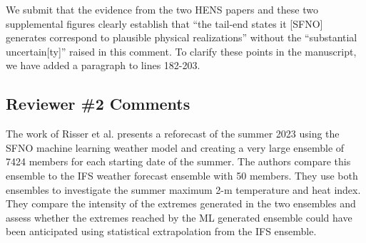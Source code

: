\documentclass[11pt]{article}
\newcommand{\newTxt}{\textcolor{cadmiumgreen}}
\begin{document}
\begin{enumerate}
{We submit that the evidence from the two HENS papers and these two supplemental figures clearly establish that ``the tail-end states it [SFNO] generates correspond to plausible physical realizations'' without the ``substantial uncertain[ty]'' raised in this comment.
}
\newTxt{To clarify these points in the manuscript, we have added a paragraph to lines 182-203.}


\end{enumerate}


\subsection*{Reviewer \#2 Comments}

The work of Risser et al. presents a reforecast of the summer 2023 using the SFNO machine learning weather model and creating a very large ensemble of 7424 members for each starting date of the summer. The authors compare this ensemble to the IFS weather forecast ensemble with 50 members. They use both ensembles to investigate the summer maximum 2-m temperature and heat index. They compare the intensity of the extremes generated in the two ensembles and assess whether the extremes reached by the ML generated ensemble could have been anticipated using statistical extrapolation from the IFS ensemble.
\end{document}
